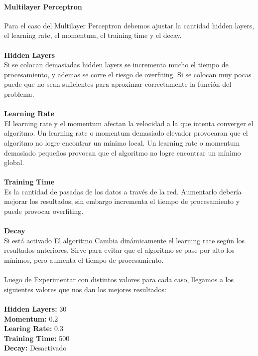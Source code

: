       \paragraph{Multilayer Perceptron}
          Para el caso del Multilayer Perceptron debemos ajustar la cantidad
          hidden layers, el learning rate, el momentum, el training time y el
          decay.\\\\
          \textbf{Hidden Layers\\}
          Si se colocan demasiadas hidden layers se incrementa mucho el tiempo
          de procesamiento, y ademas se corre el riesgo de overfiting. Si se
          colocan muy pocas puede que no sean suficientes para aproximar
          correctamente la función del problema.\\\\
          \textbf{Learning Rate\\}
          El learning rate y el momentum afectan la velocidad a la que intenta
          converger el algoritmo. Un learning rate o momentum demasiado elevador
          provocaran que el algoritmo no logre encontrar un mínimo local. Un
          learning rate o momentum demasiado pequeños provocan que el algoritmo
          no logre encontrar un mínimo global.\\\\
          \textbf{Training Time\\}
          Es la cantidad de pasadas de los datos a través de la red. Aumentarlo
          debería mejorar los resultados, sin embargo incrementa el tiempo de
          procesamiento y puede provocar overfiting.\\\\
          \textbf{Decay\\}
          Si está activado El algoritmo Cambia dinámicamente el learning rate
          según los resultados anteriores. Sirve para evitar que el algoritmo
          se pase por alto los mínimos, pero aumenta el tiempo de
          procesamiento.\\\\
          Luego de Experimentar con distintos valores para cada caso, llegamos a
          los siguientes valores que nos dan los mejores resultados:\\\\
          \textbf{Hidden Layers:} 30\\
          \textbf{Momentum:} 0.2\\
          \textbf{Learing Rate:} 0.3\\
          \textbf{Training Time:} 500\\
          \textbf{Decay:} Desactivado\\

